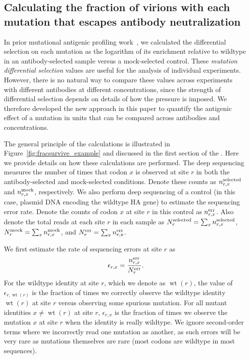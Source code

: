 \documentclass[11pt]{article}
\begin{document}
\subsection*{Calculating the fraction of virions with each mutation that escapes antibody neutralization}
In prior mutational antigenic profiling work~\citep{doud2017complete,dingens2017comprehensive}, we calculated the differential selection on each mutation as the logarithm of its enrichment relative to wildtype in an antibody-selected sample versus a mock-selected control.
These \emph{mutation differential selection} values are useful for the analysis of individual experiments.
However, there is no natural way to compare these values across experiments with different antibodies at different concentrations, since the strength of differential selection depends on details of how the pressure is imposed.
We therefore developed the new approach in this paper to quantify the antigenic effect of a mutation in units that can be compared across antibodies and concentrations.

The general principle of the calculations is illustrated in Figure~\ref{fig:fracsurvive_example} and discussed in the first section of the .
Here we provide details on how these calculations are performed.
The deep sequencing measures the number of times that codon $x$ is observed at site $r$ in both the antibody-selected and mock-selected conditions. 
Denote these counts as $n_{r,x}^{\rm{selected}}$ and $n_{r,x}^{\rm{mock}}$, respectively.
We also perform deep sequencing of a control (in this case, plasmid DNA encoding the wildtype HA gene) to estimate the sequencing error rate.
Denote the counts of codon $x$ at site $r$ in this control as $n_{r,x}^{\rm{err}}$.
Also denote the total reads at each site $r$ in each sample as
$N_{r}^{\rm{selected}} = \sum_x n_{r,x}^{\rm{selected}}$,
$N_{r}^{\rm{mock}} = \sum_x n_{r,x}^{\rm{mock}}$, and
$N_{r}^{\rm{err}} = \sum_x n_{r,x}^{\rm{err}}$.

We first estimate the rate of sequencing errors at site $r$ as
\begin{equation}
\label{eq:epsilonrx}
\epsilon_{r,x} = \frac{n_{r,x}^{\rm{err}}}{N_{r}^{\rm{err}}}.
\end{equation}
For the wildtype identity at site $r$, which we denote as $\operatorname{wt}\left(r\right)$, the value of $\epsilon_{r,\operatorname{wt}\left(r\right)}$ is the fraction of times we correctly observe the wildtype identity $\operatorname{wt}\left(r\right)$ at site $r$ versus observing some spurious mutation. 
For all mutant identities $x \ne \operatorname{wt}\left(r\right)$ at site $r$, $\epsilon_{r,x}$ is the fraction of times we observe the mutation $x$ at site $r$ when the identity is really wildtype.
We ignore second-order terms where we incorrectly read one mutation as another, as such errors will be very rare as mutations themselves are rare (most codons are wildtype in most sequences). 
\end{document}
